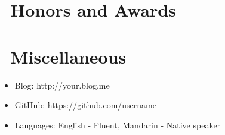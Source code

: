 \documentclass{resume}
\begin{document}



\section{\faHeartO\ Honors and Awards}

\section{\faInfo\ Miscellaneous}
\begin{itemize}[parsep=0.5ex]
  \item Blog: http://your.blog.me
  \item GitHub: https://github.com/username
  \item Languages: English - Fluent, Mandarin - Native speaker
\end{itemize}
\end{document}
